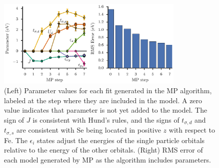 \begin{figure}
  \centering
  \includegraphics[width=0.8\textwidth]{./Figures/fese.eps}
  \caption{
    \label{fig:fese} 
    (Left) Parameter values for each fit generated in the MP algorithm, labeled at the step where they are included in the model. 
    A zero value indicates that parameter is not yet added to the model.
    The sign of $J$ is consistent with Hund's rules, and the signs of $t_{\sigma,d}$ and $t_{\sigma,s}$ are consistent with Se being located in positive $z$ with respect to Fe. 
    The $\epsilon_i$ states adjust the energies of the single particle orbitals relative to the energy of the other orbitals.
    (Right) RMS error of each model generated by MP as the algorithm includes parameters. 
  }
\end{figure}


